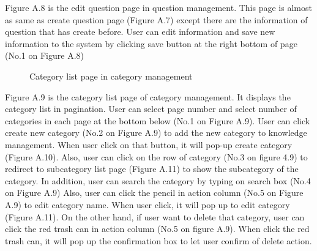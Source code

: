 \documentclass[12pt,oneside,openright,a4paper]{cpe-english-project}
\begin{document}
Figure A.8 is the edit question page in question management. This page is almost as 
same as create question page (Figure A.7) except there are the information of question that 
has create before. User can edit information and save new information to the system by 
clicking save button at the right bottom of page (No.1 on Figure A.8)

\pagebreak
{}
\begin{figure}[!h]\centering
{}
\caption{Category list page in category management}
\label{fig:Category list page in category management}
\end{figure}

Figure A.9 is the category list page of category management. It displays the category
list in pagination. User can select page number and select number of categories in each page 
at the bottom below (No.1 on Figure A.9).
User can click create new category (No.2 on Figure A.9) to add the new category to 
knowledge management. When user click on that button, it will pop-up create category
(Figure A.10). Also, user can click on the row of category (No.3 on figure 4.9) to redirect to 
subcategory list page (Figure A.11) to show the subcategory of the category. In addition, 
user can search the category by typing on search box (No.4 on Figure A.9)
Also, user can click the pencil in action column (No.5 on Figure A.9) to edit category
name. When user click, it will pop up to edit category (Figure A.11). On the other hand, if 
user want to delete that category, user can click the red trash can in action column (No.5 on 
figure A.9). When click the red trash can, it will pop up the confirmation box to let user 
confirm of delete action.
\end{document}
